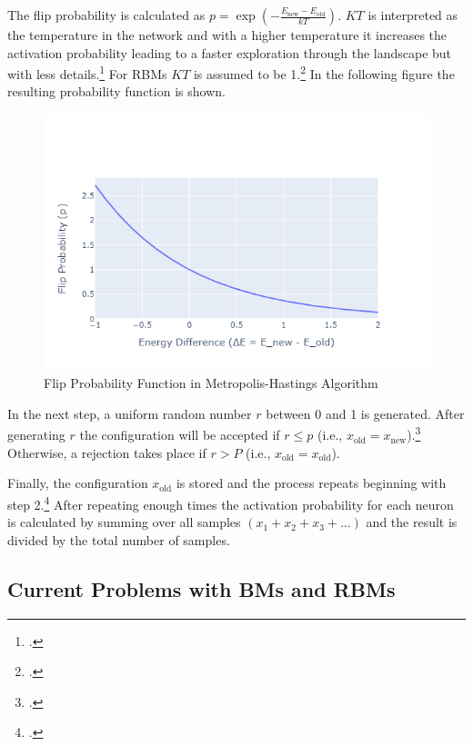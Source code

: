 The flip probability is calculated as $p=\exp\left(-\frac{E_{\text{new}}-E_{\text{old}}}{kT}\right)$.
\( KT \) is interpreted as the temperature in the network and with a higher temperature it increases
the activation probability leading to a faster exploration through the landscape but with less details.\footcite[cf.][1-9]{liTemperatureBasedRestricted2016}
For \ac{RBM}s \( KT \) is assumed to be 1.\footcite[cf.][3]{hintonBoltzmannMachines2014} In the following figure the resulting probability function is shown.

\begin{figure}[H]
    \centering
    \includegraphics[width=0.7\linewidth]{graphics/Flip Probability Function in Metropolis-Hastings Algorithm2.png}
    \caption{Flip Probability Function in Metropolis-Hastings Algorithm}
\end{figure}

In the next step, a uniform random number $r$ between 0 and 1 is generated.
After generating $r$ the configuration will be accepted if $r \leq p$ (i.e., $x_{\text{old}}=x_{\text{new}}$).\footcite[cf.][2-3]{patronOptimalRelaxationRate2024}
Otherwise, a rejection takes place if $r > P$ (i.e., $x_{\text{old}}=x_{\text{old}}$).

Finally, the configuration $x_{\text{old}}$ is stored and the process repeats beginning with step 2.\footcite[cf.][17]{patronOptimalRelaxationRate2024}
After repeating enough times the activation probability for each neuron is calculated by summing over all samples $(x_1+x_2+x_3+\ldots)$ and the result is divided by the total number of samples.

\subsection{Current Problems with BMs and RBMs}

